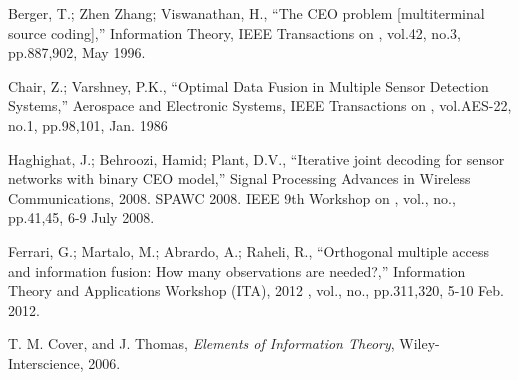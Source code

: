 \documentclass[journal]{IEEEtran}
\begin{document}



\begin{thebibliography}{99}

Berger, T.; Zhen Zhang; Viswanathan, H., ``The CEO problem [multiterminal source coding],'' 
Information Theory, IEEE Transactions on , vol.42, no.3, pp.887,902, May 1996.

Chair, Z.; Varshney, P.K., ``Optimal Data Fusion in Multiple Sensor Detection Systems,'' 
Aerospace and Electronic Systems, IEEE Transactions on , vol.AES-22, no.1, pp.98,101, Jan. 1986

 Haghighat, J.; Behroozi, Hamid; Plant, D.V., 
``Iterative joint decoding for sensor networks with binary CEO model,'' 
Signal Processing Advances in Wireless Communications, 2008. SPAWC 2008. 
IEEE 9th Workshop on , vol., no., pp.41,45, 6-9 July 2008.

 Ferrari, G.; Martalo, M.; Abrardo, A.; Raheli, R., 
``Orthogonal multiple access and information fusion: How many observations are needed?,'' 
Information Theory and Applications Workshop (ITA), 2012 , vol., no., pp.311,320, 5-10 Feb. 2012.




T. M. Cover, and J. Thomas, \textit{Elements of Information Theory}, Wiley-Interscience, 2006.



\end{thebibliography}
\end{document}
